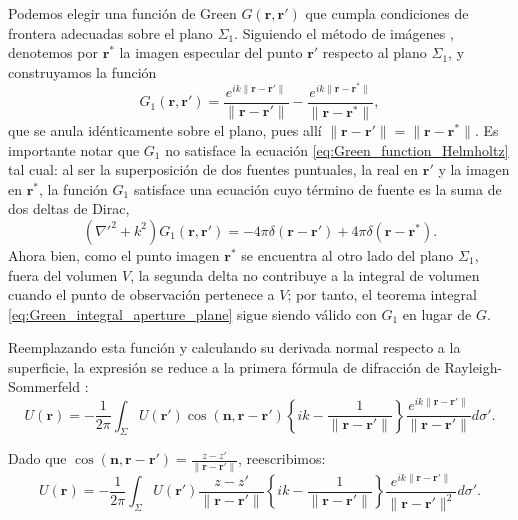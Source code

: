 Podemos elegir una función de Green $G(\mathbf{r}, \mathbf{r}')$ que cumpla condiciones de frontera adecuadas sobre el plano $\Sigma_1$. Siguiendo el método de imágenes \cite{jackson1999, goodman2005}, denotemos por $\mathbf{r}^*$ la imagen especular del punto $\mathbf{r}'$ respecto al plano $\Sigma_1$, y construyamos la función
\begin{equation}
G_1(\mathbf{r},\mathbf{r}') = \frac{e^{ik\|\mathbf{r}-\mathbf{r}'\|}}{\|\mathbf{r}-\mathbf{r}'\|} - \frac{e^{ik\|\mathbf{r}-\mathbf{r}^*\|}}{\|\mathbf{r}-\mathbf{r}^*\|},
\label{eq:Green_image_function}
\end{equation}
que se anula idénticamente sobre el plano, pues allí $\|\mathbf{r}-\mathbf{r}'\| = \|\mathbf{r}-\mathbf{r}^*\|$. Es importante notar que $G_1$ no satisface la ecuación \eqref{eq:Green_function_Helmholtz} tal cual: al ser la superposición de dos fuentes puntuales, la real en $\mathbf{r}'$ y la imagen en $\mathbf{r}^*$, la función $G_1$ satisface una ecuación cuyo término de fuente es la suma de dos deltas de Dirac,
\begin{equation}
\left(\nabla'^2+k^2\right)G_1(\mathbf{r},\mathbf{r}')
=
-4\pi\delta(\mathbf{r}-\mathbf{r}')
+4\pi\delta(\mathbf{r}-\mathbf{r}^*).
\label{eq:Green_image_two_deltas}
\end{equation}
Ahora bien, como el punto imagen $\mathbf{r}^*$ se encuentra al otro lado del plano $\Sigma_1$, fuera del volumen $V$, la segunda delta no contribuye a la integral de volumen cuando el punto de observación pertenece a $V$; por tanto, el teorema integral \eqref{eq:Green_integral_aperture_plane} sigue siendo válido con $G_1$ en lugar de $G$.

Reemplazando esta función y calculando su derivada normal respecto a la superficie, la expresión se reduce a la primera fórmula de difracción de Rayleigh-Sommerfeld \cite{goodman2005}:
\begin{equation}
U(\mathbf{r}) = -\frac{1}{2\pi} \int_{\Sigma} U(\mathbf{r}') \cos(\mathbf{n}, \mathbf{r}-\mathbf{r}') \left\{ ik - \frac{1}{\|\mathbf{r}-\mathbf{r}'\|} \right\} \frac{e^{ik\|\mathbf{r}-\mathbf{r}'\|}}{\|\mathbf{r}-\mathbf{r}'\|} d\sigma'.
\end{equation}

Dado que $\cos(\mathbf{n}, \mathbf{r}-\mathbf{r}') = \frac{z-z'}{\|\mathbf{r}-\mathbf{r}'\|}$, reescribimos:
\begin{equation}
U(\mathbf{r}) = -\frac{1}{2\pi} \int_{\Sigma} U(\mathbf{r}') \frac{z-z'}{\|\mathbf{r}-\mathbf{r}'\|} \left\{ ik - \frac{1}{\|\mathbf{r}-\mathbf{r}'\|} \right\} \frac{e^{ik\|\mathbf{r}-\mathbf{r}'\|}}{\|\mathbf{r}-\mathbf{r}'\|^2} d\sigma'.
\end{equation}

